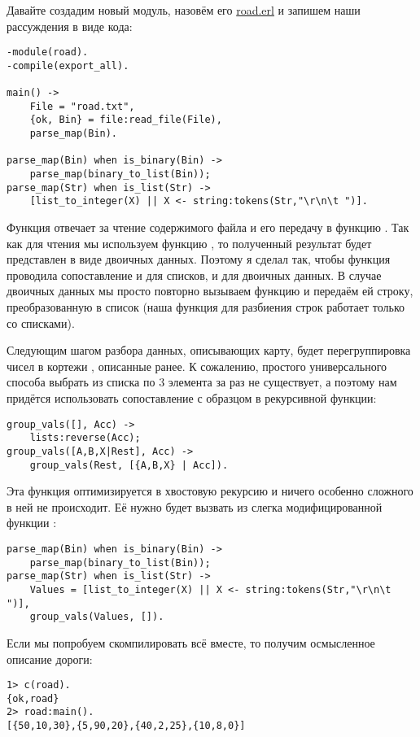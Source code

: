 Давайте создадим новый модуль, назовём его \href{http://learnyousomeerlang.com/static/erlang/road.erl}{road.erl} и запишем наши рассуждения в виде кода:
\begin{lstlisting}[style=erlang]
-module(road).
-compile(export_all).
 
main() ->
    File = "road.txt",
    {ok, Bin} = file:read_file(File),
    parse_map(Bin).
 
parse_map(Bin) when is_binary(Bin) ->
    parse_map(binary_to_list(Bin));
parse_map(Str) when is_list(Str) ->
    [list_to_integer(X) || X <- string:tokens(Str,"\r\n\t ")].
\end{lstlisting}

Функция  отвечает за чтение содержимого файла и его передачу в функцию .
Так как для чтения мы используем функцию , то полученный результат будет представлен в виде двоичных данных.
Поэтому я сделал так, чтобы функция  проводила сопоставление и для списков, и для двоичных данных.
В случае двоичных данных мы просто повторно вызываем функцию и передаём ей строку, преобразованную в список (наша функция для разбиения строк работает только со списками).

Следующим шагом разбора данных, описывающих карту, будет перегруппировка чисел в кортежи , описанные ранее.
К сожалению, простого универсального способа выбрать из списка по 3 элемента за раз не существует, а поэтому нам придётся использовать сопоставление с образцом в рекурсивной функции:
\begin{lstlisting}[style=erlang]
group_vals([], Acc) ->
    lists:reverse(Acc);
group_vals([A,B,X|Rest], Acc) ->
    group_vals(Rest, [{A,B,X} | Acc]).
\end{lstlisting}

Эта функция оптимизируется в хвостовую рекурсию и ничего особенно сложного в ней не происходит.
Её нужно будет вызвать из слегка модифицированной функции :
\begin{lstlisting}[style=erlang]
parse_map(Bin) when is_binary(Bin) ->
    parse_map(binary_to_list(Bin));
parse_map(Str) when is_list(Str) ->
    Values = [list_to_integer(X) || X <- string:tokens(Str,"\r\n\t ")],
    group_vals(Values, []).
\end{lstlisting}

Если мы попробуем скомпилировать всё вместе, то получим осмысленное описание дороги:
\begin{lstlisting}[style=erlang]
1> c(road).
{ok,road}
2> road:main().
[{50,10,30},{5,90,20},{40,2,25},{10,8,0}]
\end{lstlisting}

